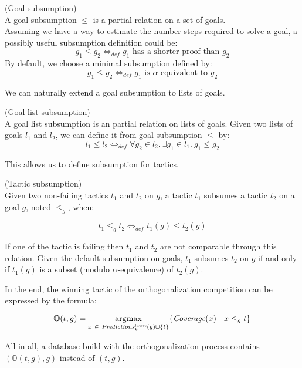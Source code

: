 \documentclass[runningheads,a4paper,draft]{svjour3}
\DeclareMathOperator*{\argmax}{\arg\!\max}
\begin{document}
\begin{definition} (Goal subsumption)\\
A goal subsumption $\le$ is a partial relation on a set of goals.\\
Assuming we have a way to estimate the number steps required to solve a goal,
a possibly useful subsumption definition could be:
\[g_1 \le g_2  \Leftrightarrow_{def} g_1 \mbox{ has a shorter proof than }
g_2\]
By default, we choose a minimal subsumption defined by:
\[g_1 \le g_2  \Leftrightarrow_{def} g_1 \mbox{ is }\alpha\mbox{-equivalent
to } g_2\]
\end{definition}

We can naturally extend a goal subsumption to lists of goals.
\begin{definition} (Goal list subsumption)\\
A goal list subsumption is an partial relation on lists of goals.
Given two lists of goals $l_1$ and $l_2$, we can define it from goal
subsumption $\le$ by:
\[l_1 \le l_2  \Leftrightarrow_{def} \forall g_2 \in l_2.\ \exists g_1 \in l_1.\
g_1 \le g_2\]
\end{definition}

This allows us to define subsumption for tactics.
\begin{definition}\label{def:tacsub}(Tactic subsumption)\\
Given two non-failing tactics $t_1$ and $t_2$ on $g$, a tactic $t_1$ subsumes a
tactic $t_2$ on a goal $g$, noted $\le_g$, when:

 \[t_1 \le_g t_2 \Leftrightarrow_{def} t_1(g) \le t_2(g)\]

If one of the tactic is failing then $t_1$ and $t_2$ are not comparable through
this relation.
Given the default subsumption on goals, $t_1$ subsumes $t_2$ on $g$ if and only
if $t_1(g)$ is a subset (modulo $\alpha$-equivalence) of $t_2(g)$.
\end{definition}

In the end, the winning tactic of the orthogonalization competition can be
expressed by the formula:

\[\mathbb{O}(t,g) = \argmax_{x\ \in\
\mathit{Predictions}^{\mathit{tactic}}_k(g) \cup
\lbrace t
\rbrace} \lbrace
\textit{\mbox{Coverage}}(x)\
|\ x \le_g t\rbrace\]

All in all, a database build with the orthogonalization process contains
$(\mathbb{O}(t,g),g)$ instead of $(t,g)$.
\end{document}
